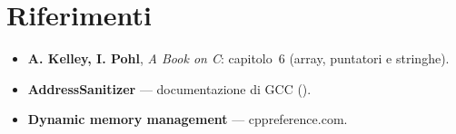 \section{Riferimenti}

\begin{itemize}
  \item \textbf{A. Kelley, I. Pohl}, \textit{A Book on C}: capitolo~6
        (array, puntatori e stringhe).
  \item \textbf{AddressSanitizer} --- documentazione di GCC
        (). \\
  \item \textbf{Dynamic memory management} --- cppreference.com. \\
\end{itemize}
